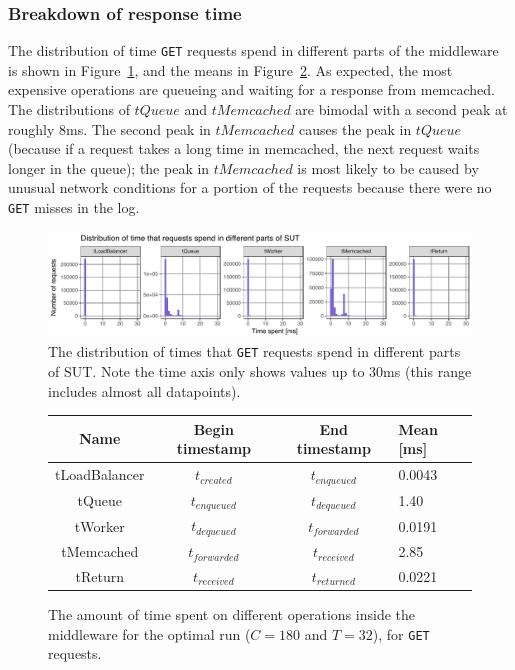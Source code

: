 \documentclass[11pt]{article}
\newcommand{\get}[0]{\texttt{GET}}
\begin{document}
\subsubsection{Breakdown of response time} The distribution of time \get{} requests spend in different parts of the middleware is shown in Figure~\ref{fig:exp1:res:breakdown}, and the means in Figure~\ref{fig:exp1:table}. As expected, the most expensive operations are queueing and waiting for a response from memcached. The distributions of $tQueue$ and $tMemcached$ are bimodal with a second peak at roughly 8ms. The second peak in $tMemcached$ causes the peak in $tQueue$ (because if a request takes a long time in memcached, the next request waits longer in the queue); the peak in $tMemcached$ is most likely to be caused by unusual network conditions for a portion of the requests because there were no \get{} misses in the log.

\begin{figure}[h]
\centering
\includegraphics[width=\textwidth]{../results/throughput/graphs/response_time_breakdown.pdf}
\caption{The distribution of times that \get{} requests spend in different parts of SUT. Note the time axis only shows values up to 30ms (this range includes almost all datapoints).}
\label{fig:exp1:res:breakdown}
\end{figure}

\begin{figure}[h]
\begin{center}
	\begin{tabular}{|c|c|c|l |}
	\hline \textbf{Name} & \textbf{Begin timestamp} & \textbf{End timestamp} & \textbf{Mean [ms]} \\
	\hline tLoadBalancer & $t_{created}$ & $t_{enqueued}$ & 0.0043 \\
	\hline tQueue & $t_{enqueued}$ & $t_{dequeued}$ & 1.40 \\
	\hline tWorker & $t_{dequeued}$ & $t_{forwarded}$ & 0.0191 \\
	\hline tMemcached & $t_{forwarded}$ & $t_{received}$ & 2.85 \\
	\hline tReturn & $t_{received}$ & $t_{returned}$ & 0.0221 \\
	\end{tabular}
	\caption{The amount of time spent on different operations inside the middleware for the optimal run ($C=180$ and $T=32$), for \get{} requests.}
	\label{fig:exp1:table}
\end{center}
\end{figure}
\end{document}
